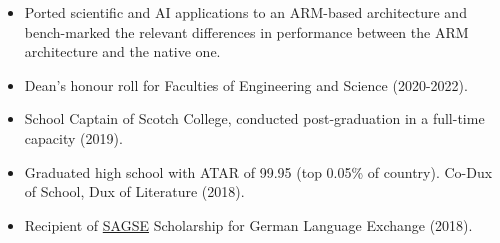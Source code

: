 \documentclass[9pt,a4paper,ragged2e]{altacv}
\begin{document}
\begin{paracol}{2}
	\divider

	\begin{itemize}
		\item Ported scientific and AI applications to an ARM-based architecture and bench-marked the relevant differences in performance between the ARM architecture and the native one.
	\end{itemize}

	\smallskip
	\begin{itemize}
		\item Dean's honour roll for Faculties of Engineering and Science (2020-2022).
		\item School Captain of Scotch College, conducted post-graduation in a full-time capacity (2019).
		\item Graduated high school with ATAR of 99.95 (top 0.05\% of country). Co-Dux of School, Dux of Literature (2018).
		\item Recipient of \href{https://www.sagse.org.au/}{SAGSE} \faLink \hspace{0.1em} Scholarship for German Language Exchange (2018).
	\end{itemize}

\end{paracol}
\end{document}

